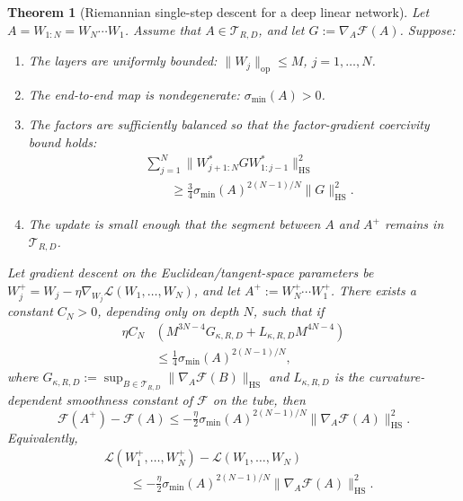\documentclass[letterpaper]{article}
\newtheorem{theorem}{Theorem}
\begin{document}
\begin{theorem}[Riemannian single-step descent for a deep linear network]
\label{thm:linear-descent}
Let \(A=W_{1:N}=W_N\cdots W_1\). Assume that \(A\in\mathcal T_{R,D}\), and
let \(G:=\nabla_A \mathcal F(A)\). Suppose:
\begin{enumerate}[leftmargin=2em]
\item The layers are uniformly bounded:
\(\|W_j\|_{\mathrm{op}}\leq M\), \(j=1,\dots,N\).
\item The end-to-end map is nondegenerate: \(\sigma_{\min}(A)>0\).
\item The factors are sufficiently balanced so that the factor-gradient
coercivity bound holds:
\[
\begin{aligned}
&\sum_{j=1}^N
\|W_{j+1:N}^*GW_{1:j-1}^*\|_{\mathrm{HS}}^2\\
&\qquad\geq
\tfrac34 \sigma_{\min}(A)^{2(N-1)/N} \|G\|_{\mathrm{HS}}^2.
\end{aligned}
\]
\item The update is small enough that the segment between \(A\) and
\(A^+\) remains in \(\mathcal T_{R,D}\).
\end{enumerate}
Let gradient descent on the Euclidean/tangent-space parameters be
\(W_j^+ = W_j - \eta \nabla_{W_j}\mathcal L(W_1,\dots,W_N)\), and let
\(A^+:=W_N^+\cdots W_1^+\). There exists a constant \(C_N>0\), depending
only on depth \(N\), such that if
\begin{equation}
\label{eq:linear-stepsize}
\begin{aligned}
\eta C_N &\left( M^{3N-4}G_{\kappa,R,D} + L_{\kappa,R,D}M^{4N-4} \right)\\
&\leq \tfrac14 \sigma_{\min}(A)^{2(N-1)/N},
\end{aligned}
\end{equation}
where \(G_{\kappa,R,D} := \sup_{B\in\mathcal T_{R,D}}\|\nabla_A\mathcal F(B)\|_{\mathrm{HS}}\)
and \(L_{\kappa, R, D}\) is the curvature-dependent smoothness constant of
$\mathcal F$ on the tube, then
\begin{equation}
\label{eq:linear-descent}
\mathcal F(A^+)-\mathcal F(A)
\leq
- \tfrac{\eta}{2} \sigma_{\min}(A)^{2(N-1)/N}
\|\nabla_A\mathcal F(A)\|_{\mathrm{HS}}^2.
\end{equation}
Equivalently,
\[
\begin{aligned}
&\mathcal L(W_1^+,\dots,W_N^+) - \mathcal L(W_1,\dots,W_N)\\
&\qquad\leq
- \tfrac{\eta}{2} \sigma_{\min}(A)^{2(N-1)/N}
\|\nabla_A\mathcal F(A)\|_{\mathrm{HS}}^2.
\end{aligned}
\]
\end{theorem}
\end{document}
